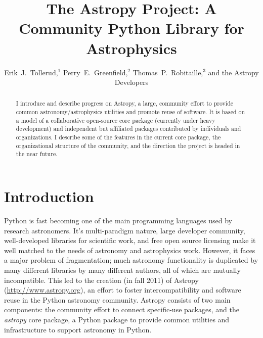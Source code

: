 

\resetcounters



\title{The Astropy Project: A Community Python Library for Astrophysics}
\author{Erik~J.~Tollerud,$^1$ Perry~E.~Greenfield,$^2$ Thomas~P.~Robitaille,$^3$ and the Astropy Developers
}


\begin{abstract}
I introduce and describe progress on Astropy, a large, community effort to provide common astronomy/astrophysics utilities and promote reuse of software. It is based on a model of a collaborative open-source core package (currently under heavy development) and independent but affiliated packages contributed by individuals and organizations. I  describe some of the features in the current core package, the organizational structure of the community, and the direction the project is headed in the near future.\end{abstract}

\section{Introduction}
Python is fast becoming one of the main programming languages used by research astronomers. It's multi-paradigm nature, large developer community, well-developed libraries for scientific work, and free open source licensing make it well matched to the needs of astronomy and astrophysics work. However, it faces a major problem of fragmentation; much astronomy functionality is duplicated by many different libraries by many different authors, all of which are mutually incompatible.  This led to the creation (in fall 2011) of Astropy (\url{http://www.astropy.org}), an effort to foster intercompatibility and software reuse in the Python astronomy community. Astropy consists of two main components: the  community effort to connect specific-use packages, and the {\it astropy} core package, a Python package to provide common utilities and infrastructure to support astronomy in Python.

